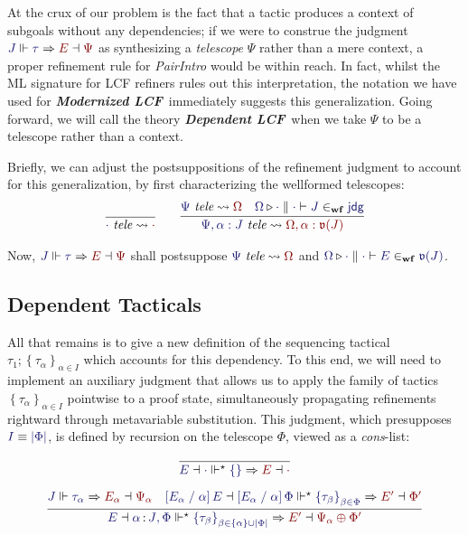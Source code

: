 \documentclass[11pt]{article}
\theoremstyle{definition}
\theoremstyle{remark}
\numberwithin{equation}{section}
\def\IModeColorName{MidnightBlue}
\def\OModeColorName{Maroon}
\newcommand\IMode[1]{{\color{\IModeColorName}{#1}}}
\newcommand\OMode[1]{{\color{\OModeColorName}{#1}}}
\newcommand\JJ{J}
\newcommand\MkSet[1]{\left\{#1\right\}}
\newcommand\MkFam[3]{\MkSet{#1_{#2}}_{#2\in #3}}
\newcommand\IsWf[5]{%
  \IMode{#1}\triangleright%
  \IMode{#2}\parallel%
  \IMode{#3}\vdash%
  \IMode{#4}\in_{\mathbf{wf}}\IMode{#5}%
}
\newcommand\IsTele[2]{
  \IMode{#1}\ \textit{tele}\leadsto \OMode{#2}
}
\newcommand\SortJdg{\mathsf{jdg}}
\newcommand\JdgValence[1]{\mathfrak{v}(#1)}
\newcommand\ISG[2]{\IMode{#1}\,{\color{Black}:}\,\IMode{#2}}
\newcommand\Refine[4]{\IMode{#1}\Vdash\IMode{#2}\Rightarrow\OMode{#4}\dashv\OMode{#3}}
\newcommand\ThenMultiAux[5]{%
  \IMode{#2}\dashv\IMode{#3}%
  \Vdash^\star\IMode{#1}\Rightarrow%
  \OMode{#4}\dashv\OMode{#5}%
}
\newcommand\ThenTac[2]{#1;#2}
\newcommand\Dom[1]{\left\vert#1\right\vert}
\newcommand\Subst[3]{\left[#1\;/\;#2\right]#3}
\newcommand\ModLCF{\textbf{\emph{Modernized LCF}}}
\newcommand\DepLCF{\textbf{\emph{Dependent LCF}}}
\newcommand\IsEquiv[2]{\IMode{#1}\equiv\IMode{#2}}
\begin{document}
At the crux of our problem is the fact that a tactic produces a context of subgoals
without any dependencies; if we were to construe the judgment
$\Refine{\JJ}{\tau}{\Psi}{E}$ as synthesizing a \emph{telescope} $\Psi$ rather
than a mere context, a proper refinement rule for \emph{PairIntro} would be
within reach. In fact, whilst the ML signature for LCF refiners rules out this
interpretation, the notation we have used for \ModLCF\ immediately suggests
this generalization. Going forward, we will call the theory \DepLCF\ when we
take $\Psi$ to be a telescope rather than a context.

Briefly, we can adjust the postsuppositions of the refinement judgment to
account for this generalization, by first characterizing the wellformed
telescopes:
\begin{gather*}
  \infer{
    \IsTele{\cdot}{\cdot}
  }{
  }\qquad
  \infer{
    \IsTele{\Psi,\alpha:\JJ}{\Omega,\alpha:\JdgValence{\JJ}}
  }{
    \IsTele{\Psi}{\Omega} &
    \IsWf{\Omega}{\cdot}{\cdot}{\JJ}{\SortJdg}
  }
\end{gather*}

Now, $\Refine{\JJ}{\tau}{\Psi}{E}$ shall postsuppose $\IsTele{\Psi}{\Omega}$
and $\IsWf{\Omega}{\cdot}{\cdot}{E}{\JdgValence{\JJ}}$.

\subsection{Dependent Tacticals}
All that remains is to give a new definition of the sequencing tactical
$\ThenTac{\tau_1}{\MkFam{\tau}{\alpha}{I}}$ which accounts for this dependency.
To this end, we will need to implement an auxiliary judgment
\framebox{$\ThenMultiAux{\MkFam{\tau}{\alpha}{I}}{E}{\Phi}{E'}{\Phi'}$} that
allows us to apply the family of tactics $\MkFam{\tau}{\alpha}{I}$ pointwise to
a proof state, simultaneously propagating refinements rightward through
metavariable substitution. This judgment, which presupposes
$\IsEquiv{I}{\Dom\Phi}$, is defined by recursion on the telescope $\Phi$,
viewed as a \emph{cons}-list:

\begin{gather*}
  \infer{
    \ThenMultiAux{\MkSet{}}{E}{\cdot}{E}{\cdot}
  }{
  }\\[6pt]
  \infer{
    \ThenMultiAux{
      \MkFam{\tau}{\beta}{\MkSet{\alpha}\cup\Dom\Phi}
    }{E}{
      \ISG{\alpha}{\JJ},\Phi
    }{E'}{
      \Psi_\alpha\oplus\Phi'
    }
  }{
    \Refine{\JJ}{\tau_\alpha}{\Psi_\alpha}{E_\alpha} &
    \ThenMultiAux{
      \MkFam{\tau}{\beta}{\Phi}
    }{
      \Subst{E_\alpha}{\alpha}{E}%
    }{
      \Subst{E_\alpha}{\alpha}{\Phi}
    }{E'}{\Phi'}
  }
\end{gather*}
\end{document}
